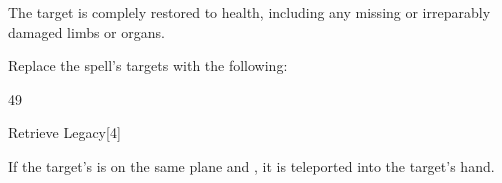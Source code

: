 
The target is complely restored to health, including any missing or irreparably damaged limbs or organs.



Replace the spell's targets with the following:
\begin{spellcontent}

\begin{augmenttargetinginfo}


 49
\end{augmenttargetinginfo}

\end{spellcontent}





\begin{spellsection}{Retrieve Legacy}[4]

\begin{spellcontent}

\begin{spelltargetinginfo}




\end{spelltargetinginfo}


\begin{spelleffects}



\spelleffect
If the target's  is on the same plane and , it is teleported into the target's hand.








\end{spelleffects}

\end{spellcontent}
\begin{spellfooter}


\end{spellfooter}
\begin{spellsubcontent}


\end{spellsubcontent}
\end{spellsection}


